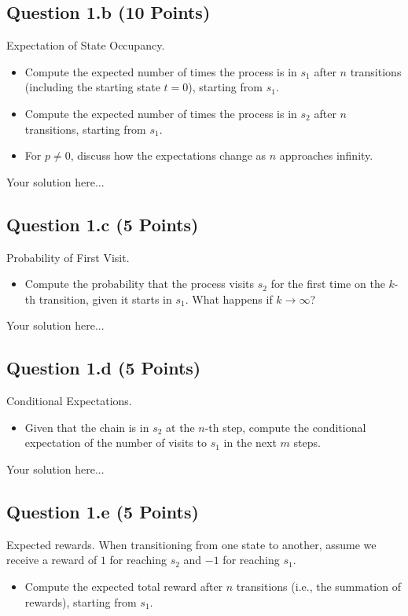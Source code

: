 \documentclass[12pt]{article}
\begin{document}
\subsection*{Question 1.b (10 Points)} Expectation of State Occupancy.
    \begin{itemize}
        \item Compute the expected number of times the process is in $s_1$ after $n$ transitions (including the starting state $t=0$), starting from $s_1$. 
        \item Compute the expected number of times the process is in $s_2$ after $n$ transitions, starting from $s_1$.
        \item For $p \ne 0$, discuss how the expectations change as 
$n$ approaches infinity.
    \end{itemize}
\begin{solution}
Your solution here...
\end{solution}

\subsection*{Question 1.c (5 Points)} Probability of First Visit.
    \begin{itemize}
        \item Compute the probability that the process visits $s_2$ for the first time on the 
$k$-th transition, given it starts in $s_1$. What happens if $k \to \infty$?
    \end{itemize}
\begin{solution}
Your solution here...
\end{solution}

\subsection*{Question 1.d (5 Points)} Conditional Expectations.
    \begin{itemize}
        \item Given that the chain is in $s_2$ at the $n$-th step, compute the conditional expectation of the number of visits to $s_1$ in the next $m$ steps.
    \end{itemize}
\begin{solution}
Your solution here...
\end{solution}

\subsection*{Question 1.e (5 Points)} Expected rewards. When transitioning from one state to another, assume we receive a reward of $1$ for reaching $s_2$ and $-1$ for reaching $s_1$.
\begin{itemize}
    \item Compute the expected total reward after 
$n$ transitions (i.e., the summation of rewards), starting from $s_1$.
\end{itemize}
\end{document}
